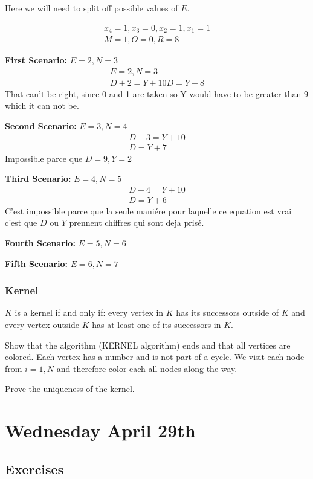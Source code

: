 \documentclass[11pt]{article}
\begin{document}
Here we will need to split off possible values of $E$.

\begin{gather}
    x_4 = 1, x_3 = 0, x_2 = 1, x_1 = 1 \\
    M = 1, O = 0, R = 8
\end{gather}

\textbf{First Scenario:} $E=2, N=3$
\begin{gather}
    E = 2, N = 3 \\
    D + 2 = Y + 10
    D  = Y + 8
\end{gather}
That can't be right, since 0 and 1 are taken so Y would have to be greater than 9 which it can not be.


\textbf{Second Scenario:} $E=3, N=4$
\begin{gather}
    D + 3 = Y + 10 \\ 
    D = Y + 7
\end{gather}
Impossible parce que $D=9, Y=2$

\textbf{Third Scenario:} $E=4, N=5$
\begin{gather}
    D + 4 = Y + 10 \\
    D = Y + 6 
\end{gather}
C'est impossible parce que la seule maniére pour laquelle ce equation est vrai c'est que $D$ ou $Y$ prennent chiffres qui sont deja prisé.

\textbf{Fourth Scenario:} $E=5, N=6$

\textbf{Fifth Scenario:} $E=6, N=7$

\subsubsection{Kernel}
$K$ is a kernel if and only if: every vertex in $K$ has its successors outside of $K$ and every vertex outside $K$ has at least one of its successors in $K$.

Show that the algorithm (KERNEL algorithm) ends and that all vertices are colored.
Each vertex has a number and is not part of a cycle. 
We visit each node from $i=1,N$ and therefore color each all nodes along the way.

Prove the uniqueness of the kernel.

\section{Wednesday April 29th}
\subsection{Exercises}
\end{document}
